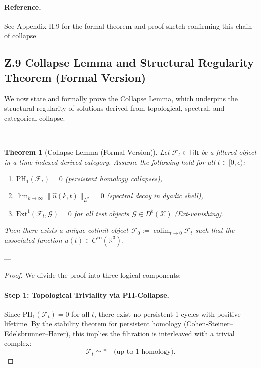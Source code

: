 \documentclass[11pt]{article}
\DeclareMathOperator{\colim}{colim}
\newtheorem{theorem}{Theorem}[section]
\begin{document}
\begin{axiom}
\begin{axiom}
{{\paragraph{Reference.}  
See Appendix H.9 for the formal theorem and proof sketch confirming this chain of collapse.



\subsection*{Z.9 Collapse Lemma and Structural Regularity Theorem (Formal Version)}

We now state and formally prove the Collapse Lemma, which underpins the structural regularity  
of solutions derived from topological, spectral, and categorical collapse.

---

\begin{theorem}[Collapse Lemma (Formal Version)]
\label{thm:collapse}
Let \( \mathcal{F}_t \in \mathsf{Filt} \) be a filtered object in a time-indexed derived category.  
Assume the following hold for all \( t \in [0, \epsilon) \):

\begin{enumerate}
    \item[(1)] \( \mathrm{PH}_1(\mathcal{F}_t) = 0 \) (persistent homology collapses),
    \item[(2)] \( \lim_{k \to \infty} \| \widehat{u}(k, t) \|_{L^2} = 0 \) (spectral decay in dyadic shell),
    \item[(3)] \( \mathrm{Ext}^1(\mathcal{F}_t, \mathcal{G}) = 0 \) for all test objects \( \mathcal{G} \in D^b(\mathcal{X}) \) (Ext-vanishing).
\end{enumerate}

Then there exists a unique colimit object \( \mathcal{F}_0 := \colim_{t \to 0} \mathcal{F}_t \)  
such that the associated function \( u(t) \in C^\infty(\mathbb{R}^3) \).
\end{theorem}

---

\begin{proof}
We divide the proof into three logical components:

\paragraph{Step 1: Topological Triviality via PH-Collapse.}
Since \( \mathrm{PH}_1(\mathcal{F}_t) = 0 \) for all \( t \),  
there exist no persistent 1-cycles with positive lifetime.  
By the stability theorem for persistent homology (Cohen-Steiner–Edelsbrunner–Harer),  
this implies the filtration is interleaved with a trivial complex:  
\[
\mathcal{F}_t \simeq \ast \quad \text{(up to 1-homology)}.
\]


\end{proof}}}
\end{axiom}
\end{axiom}
\end{document}
